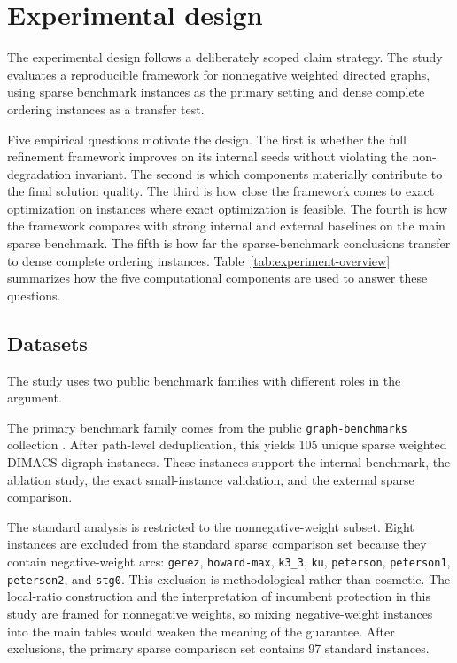 \section{Experimental design}
\label{sec:experimental-design}

The experimental design follows a deliberately scoped claim strategy. The study evaluates a reproducible framework for nonnegative weighted directed graphs, using sparse benchmark instances as the primary setting and dense complete ordering instances as a transfer test.

Five empirical questions motivate the design. The first is whether the full refinement framework improves on its internal seeds without violating the non-degradation invariant. The second is which components materially contribute to the final solution quality. The third is how close the framework comes to exact optimization on instances where exact optimization is feasible. The fourth is how the framework compares with strong internal and external baselines on the main sparse benchmark. The fifth is how far the sparse-benchmark conclusions transfer to dense complete ordering instances. Table~\ref{tab:experiment-overview} summarizes how the five computational components are used to answer these questions.



\subsection{Datasets}

The study uses two public benchmark families with different roles in the argument.

The primary benchmark family comes from the public \texttt{graph-benchmarks} collection \cite{graph_benchmarks_repo}. After path-level deduplication, this yields 105 unique sparse weighted DIMACS digraph instances. These instances support the internal benchmark, the ablation study, the exact small-instance validation, and the external sparse comparison.

The standard analysis is restricted to the nonnegative-weight subset. Eight instances are excluded from the standard sparse comparison set because they contain negative-weight arcs:
\texttt{gerez}, \texttt{howard-max}, \texttt{k3\_3}, \texttt{ku}, \texttt{peterson}, \texttt{peterson1}, \texttt{peterson2}, and \texttt{stg0}.
This exclusion is methodological rather than cosmetic. The local-ratio construction and the interpretation of incumbent protection in this study are framed for nonnegative weights, so mixing negative-weight instances into the main tables would weaken the meaning of the guarantee. After exclusions, the primary sparse comparison set contains 97 standard instances.

